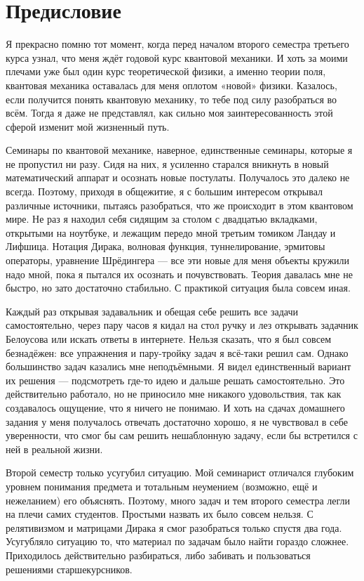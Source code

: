 \section*{Предисловие}

\hspace{1,5em}Я прекрасно помню тот момент, когда перед началом второго семестра третьего курса узнал, что меня ждёт годовой курс квантовой механики. И хоть за моими плечами уже был один курс теоретической физики, а именно теории поля, квантовая механика оставалась для меня оплотом «новой» физики. Казалось, если получится понять квантовую механику, то тебе под силу разобраться во всём. Тогда я даже не представлял, как сильно моя заинтересованность этой сферой изменит мой жизненный путь.

Семинары по квантовой механике, наверное, единственные семинары, которые я не
пропустил ни разу. Сидя на них, я усиленно старался вникнуть в новый
математический аппарат и осознать новые постулаты. Получалось это далеко не
всегда. Поэтому, приходя в общежитие, я с большим интересом открывал различные
источники, пытаясь разобраться, что же происходит в этом квантовом мире. Не раз
я находил себя сидящим за столом с двадцатью вкладками, открытыми на ноутбуке,
и лежащим передо мной третьим томиком Ландау и Лифшица. Нотация Дирака,
волновая функция, туннелирование, эрмитовы операторы, уравнение Шрёдингера ---
все эти новые для меня объекты кружили надо мной, пока я пытался их осознать и
почувствовать. Теория давалась мне не быстро, но зато достаточно стабильно. С
практикой ситуация была совсем иная.

Каждый раз открывая задавальник и обещая себе решить все задачи самостоятельно,
через пару часов я кидал на стол ручку и лез открывать задачник Белоусова или
искать ответы в интернете. Нельзя сказать, что я был совсем безнадёжен: все
упражнения и пару-тройку задач я всё-таки решил сам. Однако большинство задач
казались мне неподъёмными. Я видел единственный вариант их решения ---
подсмотреть где-то идею и дальше решать самостоятельно. Это действительно
работало, но не приносило мне никакого удовольствия, так как создавалось
ощущение, что я ничего не понимаю. И хоть на сдачах домашнего задания у меня
получалось отвечать достаточно хорошо, я не чувствовал в себе уверенности, что
смог бы сам решить нешаблонную задачу, если бы встретился с ней в реальной
жизни.

Второй семестр только усугубил ситуацию. Мой семинарист отличался глубоким
уровнем понимания предмета и тотальным неумением (возможно, ещё и нежеланием)
его объяснять. Поэтому, много задач и тем второго семестра легли на плечи самих
студентов. Простыми назвать их было совсем нельзя. С релятивизмом и матрицами
Дирака я смог разобраться только спустя два года. Усугубляло ситуацию то, что
материал по задачам было найти гораздо сложнее. Приходилось действительно
разбираться, либо забивать и пользоваться решениями старшекурсников.

